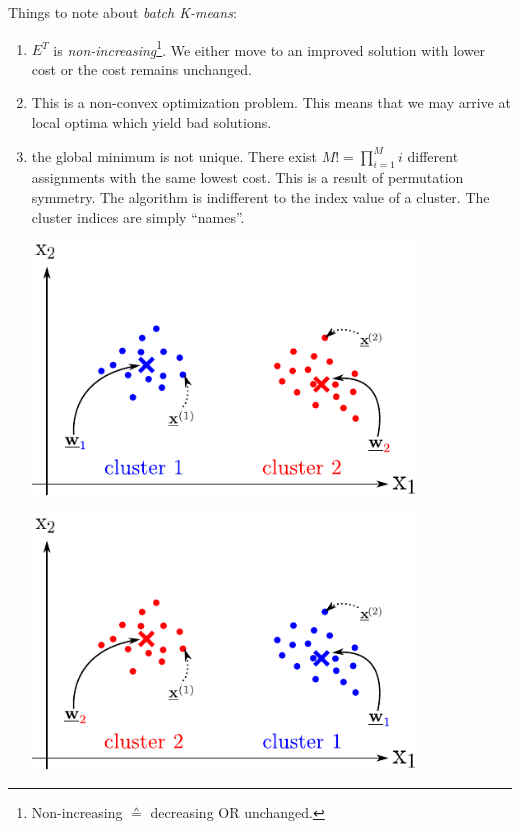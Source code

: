 \begin{frame}
Things to note about \emph{batch K-means}:

\begin{enumerate}
\item $E^T$ is \emph{non-increasing}\footnote{Non-increasing $\corresponds$ decreasing OR unchanged.}. We either move to an improved solution with lower cost or the cost remains unchanged.
\item This is a non-convex optimization problem. This means that we may arrive at local optima which yield bad solutions.
\item {}the global minimum is not unique. There exist $M! = \prod_{i=1}^{M} i$ different assignments with the same lowest cost. This is a result of permutation symmetry. 
The algorithm is indifferent to the index value of a cluster. The cluster indices are simply ``names''.
\begin{center}
\begin{minipage}{0.45\textwidth}
	\includegraphics[width=0.8\textwidth]{img/clustering_color_proto}
\end{minipage}
\begin{minipage}{0.45\textwidth}
	\includegraphics[width=0.8\textwidth]{img/clustering_color_proto_swap}
\end{minipage}
\end{center}
 
\end{enumerate}

\end{frame}


